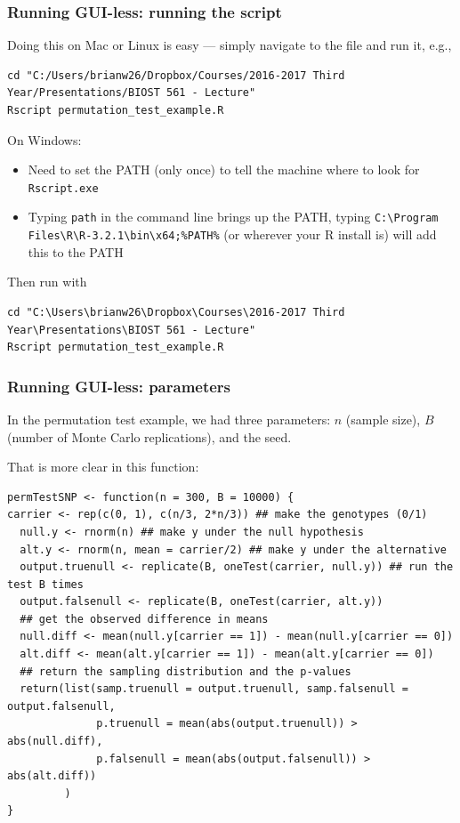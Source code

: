 \documentclass[12pt, 
hyperref={colorlinks=true, linkcolor=blue, urlcolor=cyan}]{beamer}
\begin{document}
\begin{frame}[fragile]
\frametitle{Running GUI-less: running the script}
Doing this on Mac or Linux is easy --- simply navigate to the file and run it, e.g.,{\tiny
\begin{verbatim}
cd "C:/Users/brianw26/Dropbox/Courses/2016-2017 Third Year/Presentations/BIOST 561 - Lecture"
Rscript permutation_test_example.R
\end{verbatim}
}
On Windows:
\begin{itemize}
\item Need to set the PATH (only once) to tell the machine where to look for \texttt{Rscript.exe}
\item Typing \texttt{path} in the command line brings up the PATH, typing
{\scriptsize \texttt{C:\textbackslash Program Files\textbackslash R\textbackslash R-3.2.1\textbackslash bin\textbackslash x64;\%PATH\%} } (or wherever your R install is) will add this to the PATH
\end{itemize}
Then run with 
{\tiny
\begin{verbatim}
cd "C:\Users\brianw26\Dropbox\Courses\2016-2017 Third Year\Presentations\BIOST 561 - Lecture"
Rscript permutation_test_example.R
\end{verbatim}
}
\end{frame}


\begin{frame}[fragile]
\frametitle{Running GUI-less: parameters}
In the permutation test example, we had three parameters: $n$ (sample size), $B$ (number of Monte Carlo replications), and the seed.

That is more clear in this function:
{\scriptsize
\begin{verbatim}
permTestSNP <- function(n = 300, B = 10000) {
carrier <- rep(c(0, 1), c(n/3, 2*n/3)) ## make the genotypes (0/1)
  null.y <- rnorm(n) ## make y under the null hypothesis
  alt.y <- rnorm(n, mean = carrier/2) ## make y under the alternative 
  output.truenull <- replicate(B, oneTest(carrier, null.y)) ## run the test B times
  output.falsenull <- replicate(B, oneTest(carrier, alt.y))
  ## get the observed difference in means
  null.diff <- mean(null.y[carrier == 1]) - mean(null.y[carrier == 0])
  alt.diff <- mean(alt.y[carrier == 1]) - mean(alt.y[carrier == 0])
  ## return the sampling distribution and the p-values
  return(list(samp.truenull = output.truenull, samp.falsenull = output.falsenull,
              p.truenull = mean(abs(output.truenull)) > abs(null.diff),
              p.falsenull = mean(abs(output.falsenull)) > abs(alt.diff))
         )
}
\end{verbatim}
}
\end{frame}
\end{document}
